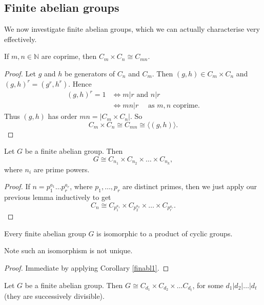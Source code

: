 \documentclass[egregdoesnotlikesansseriftitles,a4paper]{scrartcl}
\begin{document}
\subsection{Finite abelian groups}
We now investigate finite abelian groups, which we can actually characterise very effectively.
\begin{lemma}
      If $m,n \in \mathbb{N}$ are coprime, then $C_m \times C_n \cong C_{mn}$.
\end{lemma}
\begin{proof}
      Let $g$ and $h$ be generators of $C_n$ and $C_m$. Then $(g,h)\in C_m \times C_n$ and $(g,h)^{r}=(g^{r}, h^{r})$. Hence 
      \begin{align*}
           (g,h)^{r}=1 &\iff m|r \text{ and } n|r\\
           & \iff mn|r \quad \text{ as } m,n \text{ coprime}.
      \end{align*}
      Thus $(g,h)$ has order $mn =|C_m \times C_n|$. So \[
      C_m \times C_n \cong C_{mn} \cong \langle (g,h) \rangle 
      .\]
\end{proof}
\begin{corollary}\label{finabl1}
     Let $G$ be a finite abelian group. Then \[
     G \cong C_{n_1 } \times C_{n_2 }\times \ldots \times C_{n_k}
     ,\] where $n_{i}$ are prime powers. 
\end{corollary}
\begin{proof}
      If $n=p_1^{a_1 }\ldots p_r ^{a_r}$, where $p_1 ,\ldots , p_r$ are distinct primes, then we just apply our previous lemma inductively to get \[
      C_{n}\cong C_{p_1 ^{a_1 }}\times C_{p_2 ^{a_2 }}\times \ldots \times C_{p_r ^{a_r }}
      .\] 
\end{proof}
\begin{theorem}\label{finabl2}
     Every finite abelian group $G$ is isomorphic to a product of cyclic groups.

     Note such an isomorphism is not unique.
\end{theorem}
\begin{proof}
      Immediate by applying Corollary \ref{finabl1}.
\end{proof}
\begin{theorem}\label{finabl3}
      Let $G$ be a finite abelian group. Then $G \cong C_{d_1 }\times C_{d_2 }\times \ldots C_{d_t}$, for some $d_1 | d_2 | \ldots | d_t$ (they are successively divisible).
\end{theorem}
\begin{remark}
      
\end{remark}
\end{document}
